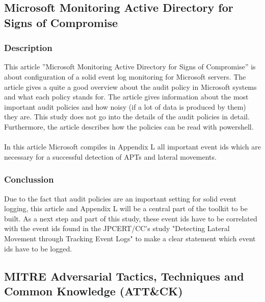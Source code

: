 \clearpage

\subsection{Microsoft Monitoring Active Directory for Signs of Compromise}
\subsubsection{Description}
This article ''Microsoft Monitoring Active Directory for Signs of Compromise'' \cite{MSADSignsOfCompromise} is about configuration of a solid event log monitoring for Microsoft servers. The article gives a quite a good overview about the audit policy in Microsoft systems and what each policy stands for. The article gives information about the most important audit policies and how noisy (if a lot of data is produced by them) they are. This study does not go into the details of the audit policies in detail. Furthermore, the article describes how the policies can be read with powershell.
\\\\
In this article Microsoft compiles in Appendix L \cite{MSAppendixL} all important event ids which are necessary for a successful detection of APTs and lateral movements.

\subsubsection{Conclussion}
Due to the fact that audit policies are an important setting for solid event logging, this article and Appendix L will be a central part of the toolkit to be built. As a next step and part of this study, these event ids have to be correlated with the event ids found in the JPCERT/CC's study "Detecting Lateral Movement through Tracking Event Logs" \cite{JPCERTDetectingLateralMovement} to make a clear statement which event ids have to be logged.

\subsection{MITRE Adversarial Tactics, Techniques and Common Knowledge (ATT\&CK)}
